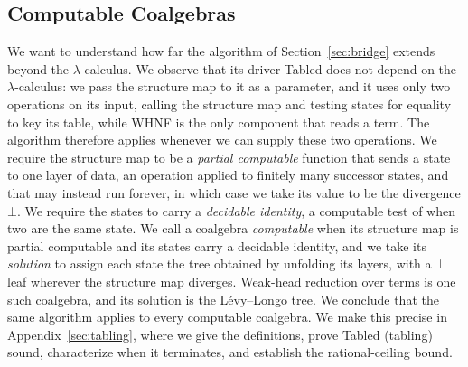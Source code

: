 \subsection{Computable Coalgebras}\label{sec:generality}
We want to understand how far the algorithm of Section~\ref{sec:bridge} extends beyond the $\lambda$-calculus. We observe that its driver \textsf{Tabled} does not depend on the $\lambda$-calculus: we pass the structure map to it as a parameter, and it uses only two operations on its input, calling the structure map and testing states for equality to key its table, while \textsf{WHNF} is the only component that reads a term. The algorithm therefore applies whenever we can supply these two operations. We require the structure map to be a \emph{partial computable} function that sends a state to one layer of data, an operation applied to finitely many successor states, and that may instead run forever, in which case we take its value to be the divergence $\bot$. We require the states to carry a \emph{decidable identity}, a computable test of when two are the same state. We call a coalgebra \emph{computable} when its structure map is partial computable and its states carry a decidable identity, and we take its \emph{solution} to assign each state the tree obtained by unfolding its layers, with a $\bot$ leaf wherever the structure map diverges. Weak-head reduction over terms is one such coalgebra, and its solution is the L\'evy--Longo tree. We conclude that the same algorithm applies to every computable coalgebra. We make this precise in Appendix~\ref{sec:tabling}, where we give the definitions, prove \textsf{Tabled} (tabling) sound, characterize when it terminates, and establish the rational-ceiling bound.

